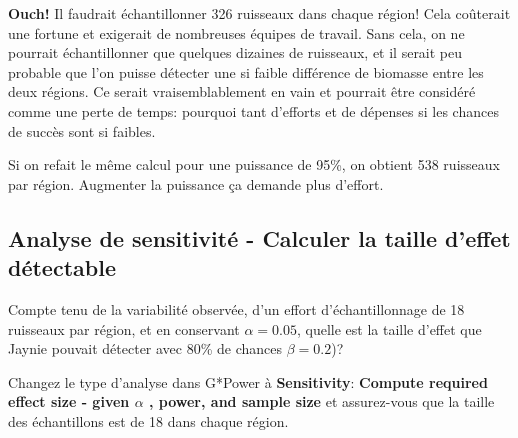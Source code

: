 \documentclass[12pt,]{book}
\makeatletter
\newenvironment{kframe}{%
\medskip{}
\setlength{\fboxsep}{.8em}
 \def\at@end@of@kframe{}%
 \ifinner\ifhmode%
  \def\at@end@of@kframe{\end{minipage}}%
  \begin{minipage}{\columnwidth}%
 \fi\fi%
 \def\FrameCommand##1{\hskip\@totalleftmargin \hskip-\fboxsep
 \colorbox{shadecolor}{##1}\hskip-\fboxsep
     \hskip-\linewidth \hskip-\@totalleftmargin \hskip\columnwidth}%
 \MakeFramed {\advance\hsize-\width
   \@totalleftmargin\z@ \linewidth\hsize
   \@setminipage}}%
 {\par\unskip\endMakeFramed%
 \at@end@of@kframe}
\newenvironment{rmdblock}[1]
  {
  \begin{itemize}
  \renewcommand{\labelitemi}{
    \raisebox{-.7\height}[0pt][0pt]{
      {\setkeys{Gin}{width=3em,keepaspectratio}\texttt{[image: images/\#1]}}
    }
  }
  \setlength{\fboxsep}{1em}
  \begin{kframe}
  \item
  }
  {
  \end{kframe}
  \end{itemize}
  }
\newenvironment{rmdcode}
  {\begin{rmdblock}{screen}}
  {\end{rmdblock}}
\makeatother
\begin{document}
\textbf{Ouch!} Il faudrait échantillonner 326 ruisseaux dans chaque région! Cela coûterait une fortune et exigerait de nombreuses équipes de travail.
Sans cela, on ne pourrait échantillonner que quelques dizaines de ruisseaux, et il serait peu probable que l'on puisse détecter une si faible différence de biomasse entre les deux régions.
Ce serait vraisemblablement en vain et pourrait être considéré comme une perte de temps: pourquoi tant d'efforts et de dépenses si les chances de succès sont si faibles.

Si on refait le même calcul pour une puissance de 95\%, on obtient 538 ruisseaux par région.
Augmenter la puissance ça demande plus d'effort.

\hypertarget{analyse-de-sensitivituxe9---calculer-la-taille-deffet-duxe9tectable}{%
\subsection{Analyse de sensitivité - Calculer la taille d'effet détectable}\label{analyse-de-sensitivituxe9---calculer-la-taille-deffet-duxe9tectable}}

Compte tenu de la variabilité observée, d'un effort d'échantillonnage de 18 ruisseaux par région, et en conservant \(\alpha=0.05\), quelle est la taille d'effet que Jaynie pouvait détecter avec 80\% de chances \(\beta=0.2\))?

\begin{rmdcode}
Changez le type d'analyse dans G*Power à \textbf{Sensitivity}: \textbf{Compute required effect size - given \(\alpha\) , power, and sample size} et assurez-vous que la taille des échantillons est de 18 dans chaque région.
\end{rmdcode}
\end{document}
